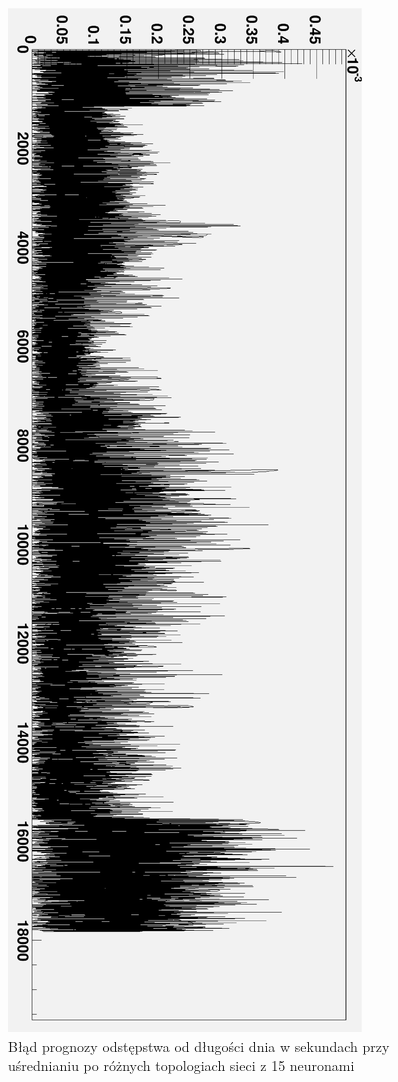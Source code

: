 \documentclass[12pt,a4]{article}
\begin{document}
\begin{figure}[htbp]
  \includegraphics[height=\textheight]{doc/img/err_g.eps}
  \caption{Błąd prognozy odstępstwa od długości dnia w sekundach przy uśrednianiu po różnych topologiach sieci z 15 neuronami}
  \label{fig:err_g}
\end{figure}
\end{document}
